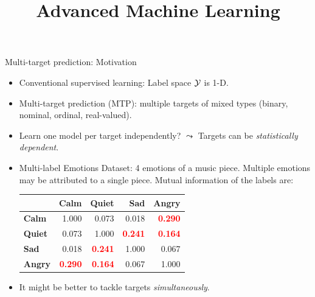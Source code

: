 \documentclass[11pt,compress,t,notes=noshow, xcolor=table]{beamer}
\title{Advanced Machine Learning}
\date{}
\begin{document}



\sloppy

\begin{vbframe}{Multi-target prediction: Motivation}
    \begin{itemize}    
        \item Conventional supervised learning: Label space $\mathcal{Y}$ is 1-D.	

        \item Multi-target prediction (MTP): multiple targets of mixed types (binary, nominal, ordinal, real-valued).
        
        \item Learn one model per target independently? $\leadsto$ Targets can be \emph{statistically dependent}.

        \item Multi-label Emotions Dataset: 4 emotions of a music piece. Multiple emotions may be attributed to a single piece. Mutual information of the labels are:
        \begin{center}
            \begin{tabular}{lrrrr}
            \toprule
              & \textbf{Calm} & \textbf{Quiet} & \textbf{Sad} & \textbf{Angry}\\
            \midrule
            \textbf{Calm} & 1.000 & 0.073 & 0.018 & \textcolor{red}{\textbf{0.290}}\\
            \textbf{Quiet} & 0.073 & 1.000 & \textcolor{red}{\textbf{0.241}} & \textcolor{red}{\textbf{0.164}}\\
            \textbf{Sad} & 0.018 & \textcolor{red}{\textbf{0.241}} & 1.000 & 0.067\\
            \textbf{Angry} & \textcolor{red}{\textbf{0.290}} & \textcolor{red}{\textbf{0.164}} & 0.067 & 1.000\\
            \bottomrule
        \end{tabular}
        \end{center}
        
		\item It might be better to tackle targets \emph{simultaneously}.
    \end{itemize}

\end{vbframe}
\end{document}
